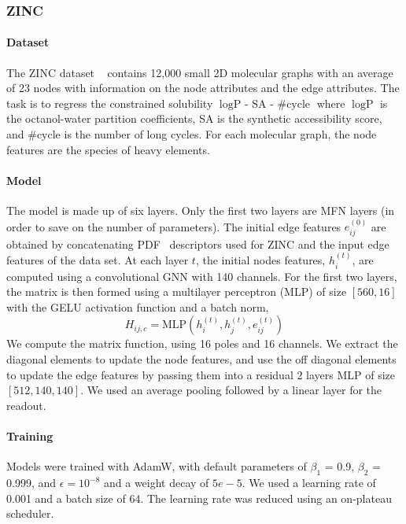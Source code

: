 \documentclass{article} \usepackage{iclr2024_conference,times}
\begin{document}
\subsubsection{ZINC}


\paragraph{Dataset}
The ZINC dataset ~\citep{Irwin2004} contains 12,000 small 2D molecular graphs with an average of 23 nodes with information on the node attributes and the edge attributes. The task is to regress the constrained solubility $\log \text{P - SA - }  \text{\#cycle}$ where $\log \text{P}$ is the octanol-water partition coefficients,
SA is the synthetic accessibility score, and $\text{\#cycle}$ is the number of long cycles. For
each molecular graph, the node features are the species of heavy elements.

\paragraph{Model}
The model is made up of six layers.
Only the first two layers are MFN layers (in order to save on the number of parameters).
The initial edge features $e_{ij}^{(0)}$ are obtained by concatenating PDF~\cite{yang2023better} descriptors used for ZINC and the input edge features of the data set.  At each layer $t$, the initial nodes features, $h_i^{(t)}$, are computed using a convolutional GNN with 140 channels. 
For the first two layers, the matrix is then formed using a multilayer perceptron (MLP) of size $[560,16]$ with the GELU activation function and a batch norm,
\begin{equation}
    H_{ij,c} = \text{MLP}(h_{i}^{(t)}, h_{j}^{(t)}, e_{ij}^{(t)})
\end{equation}
We compute the matrix function, using 16 poles and 16 channels. We extract the diagonal elements to update the node features, and use the off diagonal elements to update the edge features by passing them into a residual 2 layers MLP of size $[512, 140, 140]$. We used an average pooling followed by a linear layer for the readout.

\paragraph{Training}
 Models were trained with AdamW,
with default parameters of $\beta_{1}$ = 0.9, $\beta_{2}$ = 0.999, and $\epsilon = 10^{-8}$ and a weight decay of $5e-5$.
We used a learning rate of 0.001 and a batch size of 64.
The learning rate was reduced using an on-plateau scheduler.
\end{document}
